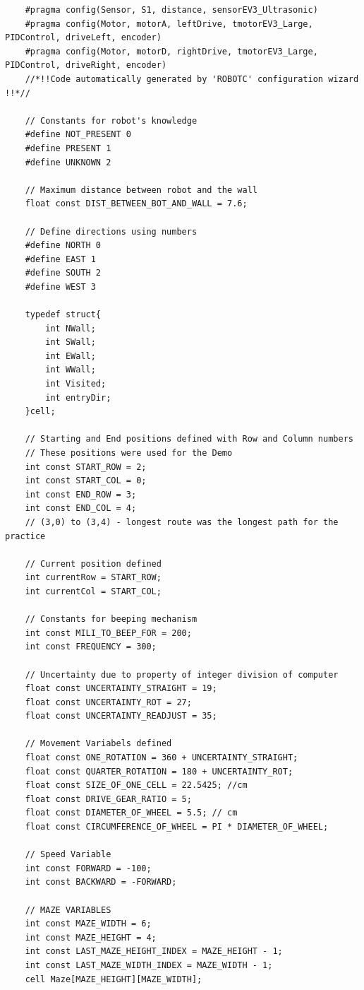 \documentclass[11pt]{article}
\begin{document}
\begin{linenumbers}
\begin{verbatim}
    #pragma config(Sensor, S1, distance, sensorEV3_Ultrasonic)
    #pragma config(Motor, motorA, leftDrive, tmotorEV3_Large, PIDControl, driveLeft, encoder)
    #pragma config(Motor, motorD, rightDrive, tmotorEV3_Large, PIDControl, driveRight, encoder)
    //*!!Code automatically generated by 'ROBOTC' configuration wizard               !!*//

    // Constants for robot's knowledge
    #define NOT_PRESENT 0
    #define PRESENT 1
    #define UNKNOWN 2

    // Maximum distance between robot and the wall
    float const DIST_BETWEEN_BOT_AND_WALL = 7.6;

    // Define directions using numbers
    #define NORTH 0
    #define EAST 1
    #define SOUTH 2
    #define WEST 3

    typedef struct{
        int NWall;
        int SWall;
        int EWall;
        int WWall;
        int Visited;
        int entryDir;
    }cell;

    // Starting and End positions defined with Row and Column numbers
    // These positions were used for the Demo
    int const START_ROW = 2;
    int const START_COL = 0;
    int const END_ROW = 3;
    int const END_COL = 4;
    // (3,0) to (3,4) - longest route was the longest path for the practice

    // Current position defined
    int currentRow = START_ROW;
    int currentCol = START_COL;

    // Constants for beeping mechanism
    int const MILI_TO_BEEP_FOR = 200;
    int const FREQUENCY = 300;

    // Uncertainty due to property of integer division of computer
    float const UNCERTAINTY_STRAIGHT = 19;
    float const UNCERTAINTY_ROT = 27;
    float const UNCERTAINTY_READJUST = 35;

    // Movement Variabels defined
    float const ONE_ROTATION = 360 + UNCERTAINTY_STRAIGHT;
    float const QUARTER_ROTATION = 180 + UNCERTAINTY_ROT;
    float const SIZE_OF_ONE_CELL = 22.5425; //cm
    float const DRIVE_GEAR_RATIO = 5;
    float const DIAMETER_OF_WHEEL = 5.5; // cm
    float const CIRCUMFERENCE_OF_WHEEL = PI * DIAMETER_OF_WHEEL;

    // Speed Variable
    int const FORWARD = -100;
    int const BACKWARD = -FORWARD;

    // MAZE VARIABLES
    int const MAZE_WIDTH = 6;
    int const MAZE_HEIGHT = 4;
    int const LAST_MAZE_HEIGHT_INDEX = MAZE_HEIGHT - 1;
    int const LAST_MAZE_WIDTH_INDEX = MAZE_WIDTH - 1;
    cell Maze[MAZE_HEIGHT][MAZE_WIDTH];


\end{verbatim}
\end{linenumbers}
\end{document}
